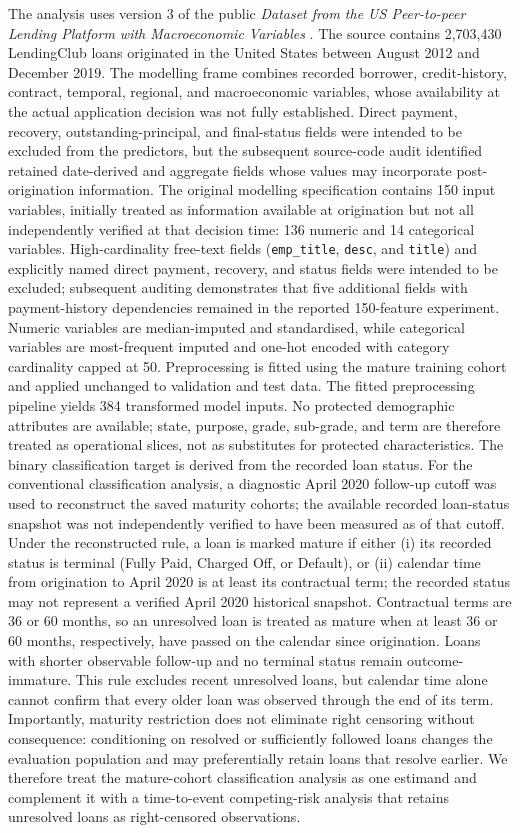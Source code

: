 \documentclass[10pt]{article}
\begin{document}
The analysis uses version 3 of the public \textit{Dataset from the US Peer-to-peer Lending Platform with Macroeconomic Variables} \cite{ref48}. The source contains 2,703,430 LendingClub loans originated in the United States between August 2012 and December 2019. The modelling frame combines recorded borrower, credit-history, contract, temporal, regional, and macroeconomic variables, whose availability at the actual application decision was not fully established. Direct payment, recovery, outstanding-principal, and final-status fields were intended to be excluded from the predictors, but the subsequent source-code audit identified retained date-derived and aggregate fields whose values may incorporate post-origination information. The original modelling specification contains 150 input variables, initially treated as information available at origination but not all independently verified at that decision time: 136 numeric and 14 categorical variables. High-cardinality free-text fields (\texttt{emp\_title}, \texttt{desc}, and \texttt{title}) and explicitly named direct payment, recovery, and status fields were intended to be excluded; subsequent auditing demonstrates that five additional fields with payment-history dependencies remained in the reported 150-feature experiment. Numeric variables are median-imputed and standardised, while categorical variables are most-frequent imputed and one-hot encoded with category cardinality capped at 50. Preprocessing is fitted using the mature training cohort and applied unchanged to validation and test data. The fitted preprocessing pipeline yields 384 transformed model inputs. No protected demographic attributes are available; state, purpose, grade, sub-grade, and term are therefore treated as operational slices, not as substitutes for protected characteristics. The binary classification target is derived from the recorded loan status. For the conventional classification analysis, a diagnostic April 2020 follow-up cutoff was used to reconstruct the saved maturity cohorts; the available recorded loan-status snapshot was not independently verified to have been measured as of that cutoff. Under the reconstructed rule, a loan is marked mature if either (i) its recorded status is terminal (Fully Paid, Charged Off, or Default), or (ii) calendar time from origination to April 2020 is at least its contractual term; the recorded status may not represent a verified April 2020 historical snapshot. Contractual terms are 36 or 60 months, so an unresolved loan is treated as mature when at least 36 or 60 months, respectively, have passed on the calendar since origination. Loans with shorter observable follow-up and no terminal status remain outcome-immature. This rule excludes recent unresolved loans, but calendar time alone cannot confirm that every older loan was observed through the end of its term. Importantly, maturity restriction does not eliminate right censoring without consequence: conditioning on resolved or sufficiently followed loans changes the evaluation population and may preferentially retain loans that resolve earlier. We therefore treat the mature-cohort classification analysis as one estimand and complement it with a time-to-event competing-risk analysis that retains unresolved loans as right-censored observations.
\end{document}

